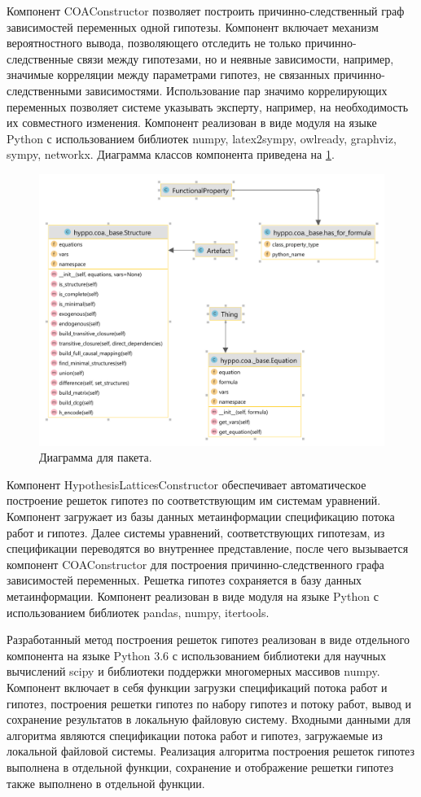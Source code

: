 Компонент COAConstructor позволяет построить причинно-следственный граф зависимостей переменных одной гипотезы. 
Компонент включает механизм вероятностного вывода, позволяющего отследить не только причинно-следственные связи между 
гипотезами, но и неявные зависимости, например, значимые корреляции между параметрами гипотез, не связанных 
причинно-следственными зависимостями. Использование пар значимо коррелирующих переменных позволяет системе указывать 
эксперту, например, на необходимость их совместного изменения. Компонент реализован в виде модуля на языке Python 
с использованием библиотек numpy, latex2sympy, owlready, graphviz, sympy, networkx. Диаграмма классов компонента 
приведена на \cref{fig:base_coa}.

\begin{figure}[h!]
    \centering
    \includegraphics[width=0.9\linewidth]{images/base_coa.pdf}
    \caption{Диаграмма для пакета.}\label{fig:base_coa}
\end{figure}


Компонент HypothesisLatticesConstructor обеспечивает автоматическое построение решеток гипотез по соответствующим 
им системам уравнений. Компонент загружает из базы данных метаинформации спецификацию потока работ и гипотез. 
Далее системы уравнений, соответствующих гипотезам, из спецификации переводятся во внутреннее представление, 
после чего вызывается компонент COAConstructor для построения причинно-следственного графа зависимостей переменных. 
Решетка гипотез сохраняется в базу данных метаинформации. Компонент реализован в виде модуля на языке Python с 
использованием библиотек pandas, numpy, itertools.

Разработанный метод построения решеток гипотез реализован в виде отдельного компонента на языке Python 3.6 с 
использованием библиотеки для научных вычислений scipy и библиотеки поддержки многомерных массивов numpy. Компонент 
включает в себя функции загрузки спецификаций потока работ и гипотез, построения решетки гипотез по набору гипотез и 
потоку работ, вывод и сохранение результатов в локальную файловую систему. Входными данными для алгоритма являются 
спецификации потока работ и гипотез, загружаемые из локальной файловой системы. Реализация алгоритма построения 
решеток гипотез выполнена в отдельной функции, сохранение и отображение решетки гипотез также выполнено 
в отдельной функции.

